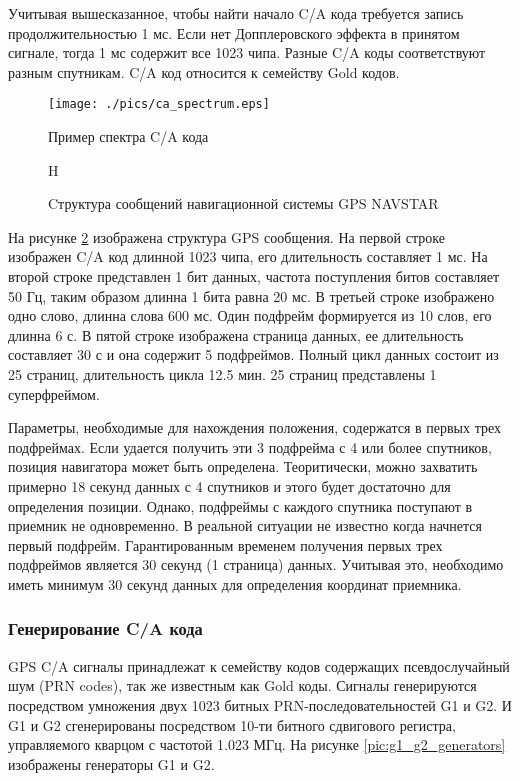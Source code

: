 Учитывая вышесказанное, чтобы найти начало C/A кода требуется запись продолжительностью 1 мс. Если нет Допплеровского
эффекта в принятом сигнале, тогда 1 мс содержит все 1023 чипа. Разные C/A коды соответствуют разным спутникам.
C/A код относится к семейству Gold кодов.

\begin{figure}
\begin{center}
\texttt{[image: ./pics/ca\_spectrum.eps]}
\end{center}
\caption{Пример спектра C/A кода}
\label{pic:ca_spectrum}
\end{figure}

\begin{figure}{H}
\begin{center}
\end{center}
\caption{Cтруктура сообщений навигационной системы GPS NAVSTAR}
\label{pic:gps_data_format}
\end{figure}

На рисунке \ref{pic:gps_data_format} изображена структура GPS сообщения. На первой строке изображен C/A код
длинной 1023 чипа, его длительность составляет 1 мс. На второй строке представлен 1 бит данных, частота поступления
битов составляет 50 Гц, таким образом длинна 1 бита равна 20 мс. В третьей строке изображено одно слово, длинна слова
600 мс. Один подфрейм формируется из 10 слов, его длинна 6 с. В пятой строке изображена страница данных, ее длительность
составляет 30 с и она содержит 5 подфреймов. Полный цикл данных состоит из 25 страниц, длительность цикла 12.5 мин.
25 страниц представлены 1 суперфреймом.

Параметры, необходимые для нахождения положения, содержатся в первых трех подфреймах. Если удается получить эти 3
подфрейма с 4 или более спутников, позиция навигатора может быть определена.  Теоритически, можно захватить примерно
18 секунд данных с 4 спутников и этого будет достаточно для определения позиции. Однако, подфреймы с каждого спутника
поступают в приемник не одновременно. В реальной ситуации не известно когда начнется первый подфрейм. Гарантированным
временем получения первых трех подфреймов является 30 секунд (1 страница) данных. Учитывая это, необходимо иметь
минимум 30 секунд данных для определения координат приемника.

\subsubsection{Генерирование C/A кода}
GPS C/A сигналы принадлежат к семейству кодов содержащих псевдослучайный шум (PRN codes), так же известным как Gold коды.
Сигналы генерируются посредством умножения двух 1023 битных PRN-последовательностей G1 и G2. И G1 и G2 сгенерированы
посредством 10-ти битного сдвигового регистра, управляемого кварцом с частотой 1.023 МГц. На рисунке
\ref{pic:g1_g2_generators} изображены генераторы G1 и G2.

